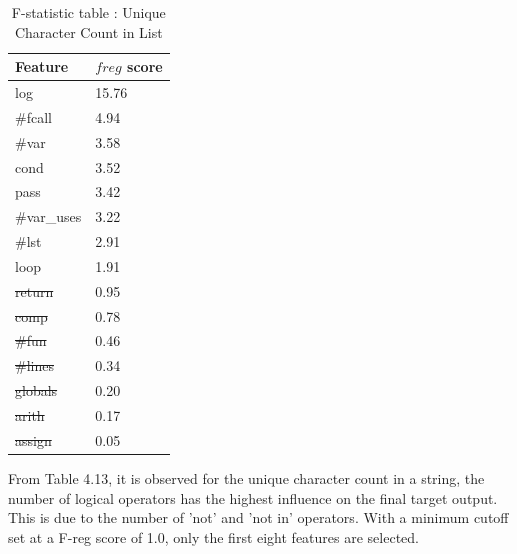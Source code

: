 \begin{itemize}
\begin{table}[H]
\centering
\caption{F-statistic table : Unique Character Count in List}
\begin{tabular}{ll}
\hline
\multicolumn{1}{|l|}{\textbf{Feature}} & \multicolumn{1}{l|}{\textbf{$f{reg}$ score}} \\ \hline
\multicolumn{1}{|l|}{log}              & \multicolumn{1}{l|}{15.76}                 \\ \hline
\multicolumn{1}{|l|}{\#fcall}          & \multicolumn{1}{l|}{4.94}                  \\ \hline
\multicolumn{1}{|l|}{\#var}            & \multicolumn{1}{l|}{3.58}                  \\ \hline
\multicolumn{1}{|l|}{cond}             & \multicolumn{1}{l|}{3.52}                  \\ \hline
\multicolumn{1}{|l|}{pass}             & \multicolumn{1}{l|}{3.42}                  \\ \hline
\multicolumn{1}{|l|}{\#var\_uses}      & \multicolumn{1}{l|}{3.22}                  \\ \hline
\multicolumn{1}{|l|}{\#lst}            & \multicolumn{1}{l|}{2.91}                  \\ \hline
\multicolumn{1}{|l|}{loop}             & \multicolumn{1}{l|}{1.91}                  \\ \hline
\multicolumn{1}{|l|}{\st{return}}           & \multicolumn{1}{l|}{0.95}                  \\ \hline
\multicolumn{1}{|l|}{\st{comp}}             & \multicolumn{1}{l|}{0.78}                  \\ \hline
\multicolumn{1}{|l|}{\st{\#fun}}            & \multicolumn{1}{l|}{0.46}                  \\ \hline
\multicolumn{1}{|l|}{\st{\#lines}}          & \multicolumn{1}{l|}{0.34}                  \\ \hline
\multicolumn{1}{|l|}{\st{globals}}         & \multicolumn{1}{l|}{0.20}                  \\ \hline
\multicolumn{1}{|l|}{\st{arith}}            & \multicolumn{1}{l|}{0.17}                  \\ \hline
\multicolumn{1}{|l|}{\st{assign}}           & \multicolumn{1}{l|}{0.05}      
\\ \hline
\end{tabular}

\label{uc_f}
\end{table}

From Table 4.13, it is observed for the unique character
count in a string, the number of logical operators has the
highest influence on the final target output. This is due to
the number of 'not' and 'not in' operators. With a minimum
cutoff set at a F-reg score of 1.0, only the first eight
features are selected.
\end{itemize}
